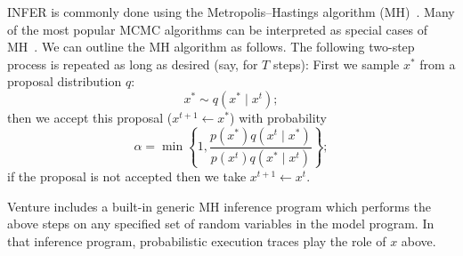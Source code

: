 \documentclass{article} %
\newcommand{\br}[1]{\left\{ #1 \right\}}
\begin{document}
INFER is commonly done using the Metropolis--Hastings algorithm (MH)~\citep{metropolis1953equation}.
Many of the most popular MCMC algorithms can be interpreted as special cases of MH~\citep{andrieu2003introduction}.
We can outline the MH algorithm as follows.
The following two-step process is repeated as long as desired (say, for $T$ steps):
First we sample $x^*$ from a proposal distribution $q$:
\begin{equation}
 x^* \sim q(x^* \mid x^{t});
\end{equation}
then we accept this proposal ($x^{t+1} \leftarrow x ^*$) with probability
\begin{equation}
  \alpha = \min \br{
    1,
    \frac{p(x^*) q(x^{t}\mid x^*)}{p(x^{t}) q(x^* \mid x^{t})}};
\end{equation}
if the proposal is not accepted then we take $x^{t+1} \gets x^t$.

Venture includes a built-in generic MH inference program which performs the above steps on any specified set of random variables in the model program.
In that inference program, probabilistic execution traces play the role of $x$ above.
\end{document}
